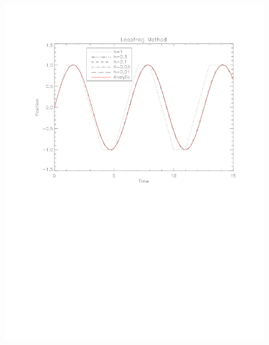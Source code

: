 \documentclass[11pt]{article}
\begin{document}
\begin{figure}
\centering
\includegraphics[scale = 0.75]{LF.pdf}
\caption{}
\end{figure}
\end{document}
